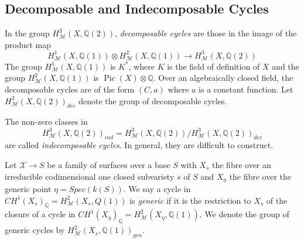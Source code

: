 \documentclass[11pt,a4paper]{article}
\newcommand {\XX}{{\mathcal X}}
\newcommand {\Q}{{\mathds Q}}
\newcommand {\M}{{\mathcal M}}
\newcommand {\RE}{{{\mathrm E}}}
\def\Pic{\operatorname{Pic}}
\begin{document}
\begin{center}
	



\end{center}

\subsection {Decomposable and Indecomposable Cycles}

\label{indecomp}

In the group $H^3_{\M}(X,\Q(2))$, {\em decomposable cycles} are those in the image of the product map 
%
$$H^1_{\M}(X,\Q(1)) \otimes H^2_{\M}(X,\Q(1)) \longrightarrow H^3_{\M}(X,\Q(2))$$
%
The group $H^1_{\M}(X,\Q(1))$  is $K^*$, where $K$ is the field of definition of $X$ and the group $H^2_{\M}(X,\Q(1))$ is $\Pic(X)\otimes \Q$. Over an algebraically closed field, the decomposable cycles are of the form $(C,a)$ where $a$ is a constant function. Let $H^3_{\M}(X,\Q(2))_{dec}$ denote the group of decomposable cycles. 

The non-zero classes in
\[H^3_{\M}(X,\Q(2))_{ind} = H^3_{\M}(X,\Q(2))/H^3_{\M}(X,\Q(2))_{dec}\]
are called \emph{indecomposable cycles}. In general, they are difficult to construct. 
\[\]

Let $\XX \rightarrow S$ be a family of surfaces  over a base $S$ with $X_s$ the fibre over an irreducible codimensional one closed subvariety $s$ of $S$ and $X_{\eta}$ the fibre over the generic point $\eta=Spec(k(S))$. We say a cycle in $CH^1(X_s)_{\Q}=H^2_{\M}(X_s,Q(1))$ is {\em generic} if it is the restriction to $X_s$ of the closure of a cycle in $CH^1(X_{\eta})_{\Q}=H^2_{\M}(X_{\eta},\Q(1))$. We denote the group of generic cycles by $H^2_{\M}(X_s,\Q(1))_{gen}$. 
\end{document}
